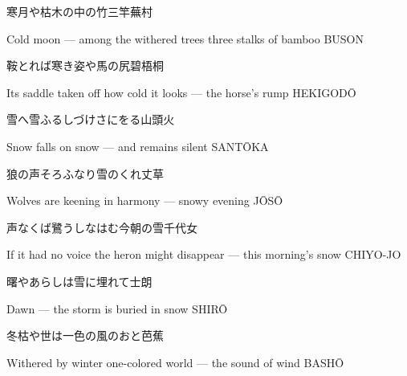 \begin{haiku}
    {\FH 寒月や枯木の中の竹三竿}\hfill{\FH 蕪村}

    \vin{} Cold moon ---
    \vin{} \vin{} among the withered trees
    \vin{} \vin{} \vin{} three stalks of bamboo \hspace{\fill} BUSON
\end{haiku}

\begin{haiku}
    {\FH 鞍とれば寒き姿や馬の尻}\hfill{\FH 碧梧桐}

    \vin{} Its saddle taken off
    \vin{} \vin{} how cold it looks ---
    \vin{} \vin{} \vin{} the horse's rump \hspace{\fill} HEKIGOD\={O}
\end{haiku}

\begin{haiku}
    {\FH 雪へ雪ふるしづけさにをる}\hfill{\FH 山頭火}

    \vin{} Snow
    \vin{} \vin{} falls on snow ---
    \vin{} \vin{} \vin{} and remains silent \hspace{\fill} SANT\={O}KA
\end{haiku}

\begin{haiku}
    {\FH 狼の声そろふなり雪のくれ}\hfill{\FH 丈草}

    \vin{} Wolves
    \vin{} \vin{} are keening in harmony ---
    \vin{} \vin{} \vin{} snowy evening \hspace{\fill} J\={O}S\={O}
\end{haiku}

\begin{haiku}
    {\FH 声なくば鷺うしなはむ今朝の雪}\hfill{\FH 千代女}

    \vin{} If it had no voice
    \vin{} \vin{} the heron might disappear ---
    \vin{} \vin{} \vin{} this morning's snow \hspace{\fill} CHIYO-JO
\end{haiku}

\begin{haiku}
    {\FH 曙やあらしは雪に埋れて}\hfill{\FH 士朗}

    \vin{} Dawn ---
    \vin{} \vin{} the storm is buried
    \vin{} \vin{} \vin{} in snow \hspace{\fill} SHIR\={O}
\end{haiku}

\begin{haiku}
    {\FH 冬枯や世は一色の風のおと}\hfill{\FH 芭蕉}

    \vin{} Withered by winter
    \vin{} \vin{} one-colored world ---
    \vin{} \vin{} \vin{} the sound of wind \hspace{\fill} BASH\={O}
\end{haiku}

